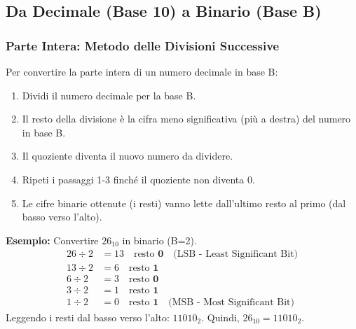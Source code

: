 \subsection{Da Decimale (Base 10) a Binario (Base B)}

\subsubsection{Parte Intera: Metodo delle Divisioni Successive}
Per convertire la parte intera di un numero decimale in base B:
\begin{enumerate}
    \item Dividi il numero decimale per la base B.
    \item Il resto della divisione è la cifra meno significativa (più a destra) del numero in base B.
    \item Il quoziente diventa il nuovo numero da dividere.
    \item Ripeti i passaggi 1-3 finché il quoziente non diventa 0.
    \item Le cifre binarie ottenute (i resti) vanno lette dall'ultimo resto al primo (dal basso verso l'alto).
\end{enumerate}
\textbf{Esempio:} Convertire $26_{10}$ in binario (B=2).
\begin{align*} 26 \div 2 &= 13 \quad \text{resto } \mathbf{0} \quad \text{(LSB - Least Significant Bit)} \\ 13 \div 2 &= 6  \quad \text{resto } \mathbf{1} \\ 6 \div 2  &= 3  \quad \text{resto } \mathbf{0} \\ 3 \div 2  &= 1  \quad \text{resto } \mathbf{1} \\ 1 \div 2  &= 0  \quad \text{resto } \mathbf{1} \quad \text{(MSB - Most Significant Bit)} \end{align*}
Leggendo i resti dal basso verso l'alto: $11010_2$.
Quindi, $26_{10} = 11010_2$.

